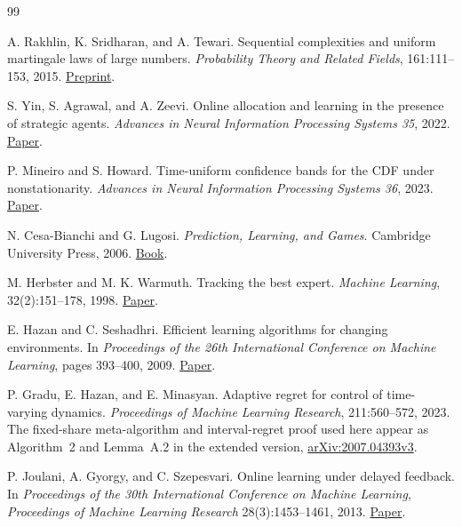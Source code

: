 \documentclass[11pt]{article}
\newcommand{\1}{\mathbf{1}}
\begin{document}
\begin{thebibliography}{99}

A. Rakhlin, K. Sridharan, and A. Tewari.
\newblock Sequential complexities and uniform martingale laws of large numbers.
\newblock \emph{Probability Theory and Related Fields},
161:111--153, 2015.
\newblock
\href{https://www.mit.edu/~rakhlin/papers/emp_proc_dep_revised.pdf}
{Preprint}.

S. Yin, S. Agrawal, and A. Zeevi.
\newblock Online allocation and learning in the presence of strategic agents.
\newblock \emph{Advances in Neural Information Processing Systems 35}, 2022.
\newblock
\href{https://papers.neurips.cc/paper_files/paper/2022/file/29455889cb812d661573f6fbc800bd9e-Paper-Conference.pdf}
{Paper}.

P. Mineiro and S. Howard.
\newblock Time-uniform confidence bands for the CDF under nonstationarity.
\newblock \emph{Advances in Neural Information Processing Systems 36}, 2023.
\newblock
\href{https://proceedings.neurips.cc/paper_files/paper/2023/hash/148bbc25b934211d80435b5cad5a7198-Abstract-Conference.html}
{Paper}.

N. Cesa-Bianchi and G. Lugosi.
\newblock \emph{Prediction, Learning, and Games}.
\newblock Cambridge University Press, 2006.
\newblock
\href{https://doi.org/10.1017/CBO9780511546921}
{Book}.

M. Herbster and M. K. Warmuth.
\newblock Tracking the best expert.
\newblock \emph{Machine Learning}, 32(2):151--178, 1998.
\newblock
\href{https://doi.org/10.1023/A:1007424614876}
{Paper}.

E. Hazan and C. Seshadhri.
\newblock Efficient learning algorithms for changing environments.
\newblock In \emph{Proceedings of the 26th International Conference on
Machine Learning}, pages 393--400, 2009.
\newblock
\href{https://doi.org/10.1145/1553374.1553425}
{Paper}.

P. Gradu, E. Hazan, and E. Minasyan.
\newblock Adaptive regret for control of time-varying dynamics.
\newblock \emph{Proceedings of Machine Learning Research},
211:560--572, 2023.
\newblock The fixed-share meta-algorithm and interval-regret proof used here
appear as Algorithm~2 and Lemma~A.2 in the extended version,
\href{https://arxiv.org/pdf/2007.04393}
{arXiv:2007.04393v3}.

P. Joulani, A. Gyorgy, and C. Szepesvari.
\newblock Online learning under delayed feedback.
\newblock In \emph{Proceedings of the 30th International Conference on
Machine Learning},
\emph{Proceedings of Machine Learning Research} 28(3):1453--1461, 2013.
\newblock
\href{https://proceedings.mlr.press/v28/joulani13.html}
{Paper}.


\end{thebibliography}
\end{document}
